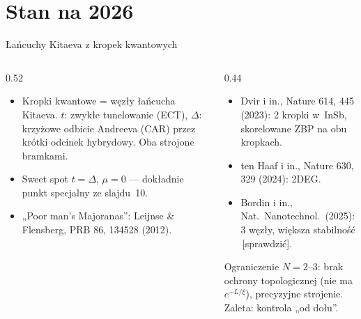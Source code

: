 \documentclass[aspectratio=169,10pt]{beamer}
\newcommand{\sprawdz}[1][sprawdzić]{\textcolor{mRed}{\scriptsize\,[#1]}}
\begin{document}
\section{Stan na 2026}

\begin{frame}{Łańcuchy Kitaeva z kropek kwantowych}
  \begin{columns}[T]
    \begin{column}{0.52\textwidth}
      \begin{itemize}
        \item Kropki kwantowe = węzły łańcucha Kitaeva.
              $t$: zwykłe tunelowanie (ECT), $\Delta$: krzyżowe odbicie Andreeva (CAR)
              przez krótki odcinek hybrydowy. Oba strojone bramkami.
        \item \alert{Sweet spot} $t=\Delta$, $\mu=0$ — dokładnie punkt specjalny ze slajdu~10.
        \item „Poor man's Majoranas”: Leijnse \& Flensberg, PRB 86, 134528 (2012).
      \end{itemize}
    \end{column}
    \begin{column}{0.44\textwidth}
      \begin{itemize}
        \item Dvir i in., Nature 614, 445 (2023): \alert{2 kropki} w~InSb,
              skorelowane ZBP na obu kropkach.
        \item ten Haaf i in., Nature 630, 329 (2024): 2DEG.
        \item Bordin i in., Nat.~Nanotechnol.\ (2025): \alert{3 węzły},
              większa stabilność \sprawdz.
      \end{itemize}
      \begin{alertblock}{Ograniczenie}
        $N=2$–3: brak ochrony topologicznej (nie ma $e^{-L/\xi}$),
        precyzyjne strojenie. Zaleta: kontrola „od dołu”.
      \end{alertblock}
    \end{column}
  \end{columns}
\end{frame}
\end{document}
